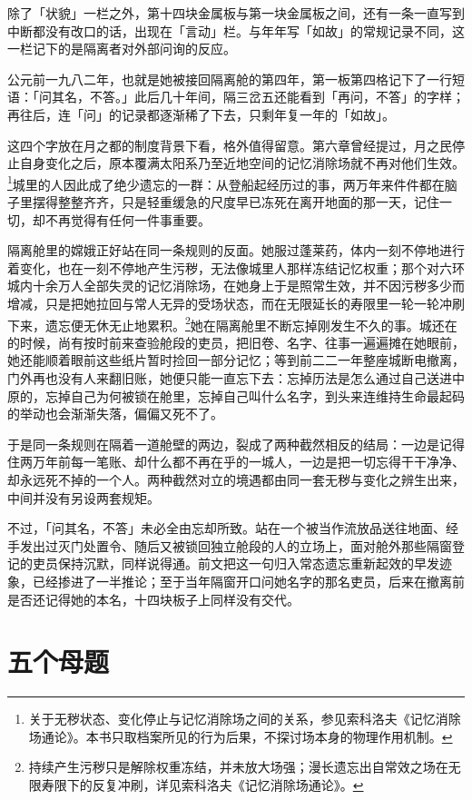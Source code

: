 除了「状貌」一栏之外，第十四块金属板与第一块金属板之间，还有一条一直写到中断都没有改口的话，出现在「言动」栏。与年年写「如故」的常规记录不同，这一栏记下的是隔离者对外部问询的反应。

公元前一九八二年，也就是她被接回隔离舱的第四年，第一板第四格记下了一行短语：「问其名，不答。」此后几十年间，隔三岔五还能看到「再问，不答」的字样；再往后，连「问」的记录都逐渐稀了下去，只剩年复一年的「如故」。

这四个字放在月之都的制度背景下看，格外值得留意。第六章曾经提过，月之民停止自身变化之后，原本覆满太阳系乃至近地空间的记忆消除场就不再对他们生效。\footnote{关于无秽状态、变化停止与记忆消除场之间的关系，参见索科洛夫《记忆消除场通论》。本书只取档案所见的行为后果，不探讨场本身的物理作用机制。}城里的人因此成了绝少遗忘的一群：从登船起经历过的事，两万年来件件都在脑子里摆得整整齐齐，只是轻重缓急的尺度早已冻死在离开地面的那一天，记住一切，却不再觉得有任何一件事重要。

隔离舱里的嫦娥正好站在同一条规则的反面。她服过蓬莱药，体内一刻不停地进行着变化，也在一刻不停地产生污秽，无法像城里人那样冻结记忆权重；那个对六环城内十余万人全部失灵的记忆消除场，在她身上于是照常生效，并不因污秽多少而增减，只是把她拉回与常人无异的受场状态，而在无限延长的寿限里一轮一轮冲刷下来，遗忘便无休无止地累积。\footnote{持续产生污秽只是解除权重冻结，并未放大场强；漫长遗忘出自常效之场在无限寿限下的反复冲刷，详见索科洛夫《记忆消除场通论》。}她在隔离舱里不断忘掉刚发生不久的事。城还在的时候，尚有按时前来查验舱段的吏员，把旧卷、名字、往事一遍遍摊在她眼前，她还能顺着眼前这些纸片暂时捡回一部分记忆；等到前二二一年整座城断电撤离，门外再也没有人来翻旧账，她便只能一直忘下去：忘掉历法是怎么通过自己送进中原的，忘掉自己为何被锁在舱里，忘掉自己叫什么名字，到头来连维持生命最起码的举动也会渐渐失落，偏偏又死不了。

于是同一条规则在隔着一道舱壁的两边，裂成了两种截然相反的结局：一边是记得住两万年前每一笔账、却什么都不再在乎的一城人，一边是把一切忘得干干净净、却永远死不掉的一个人。两种截然对立的境遇都由同一套无秽与变化之辨生出来，中间并没有另设两套规矩。

不过，「问其名，不答」未必全由忘却所致。站在一个被当作流放品送往地面、经手发出过灭门处置令、随后又被锁回独立舱段的人的立场上，面对舱外那些隔窗登记的吏员保持沉默，同样说得通。前文把这一句归入常态遗忘重新起效的早发迹象，已经掺进了一半推论；至于当年隔窗开口问她名字的那名吏员，后来在撤离前是否还记得她的本名，十四块板子上同样没有交代。

\section{五个母题}

